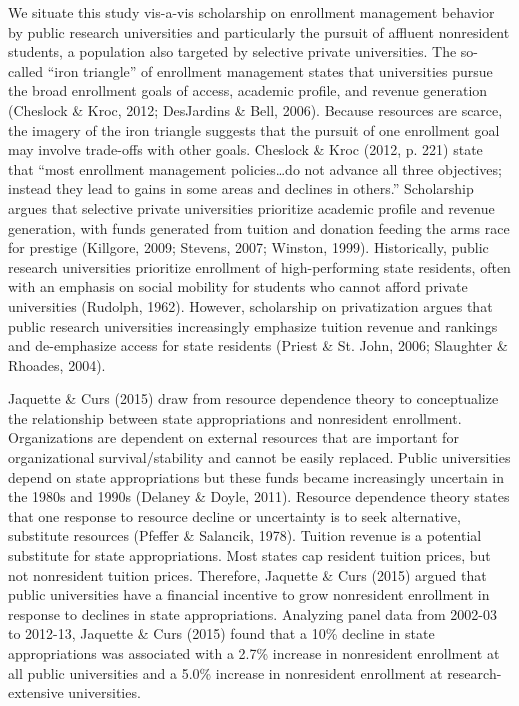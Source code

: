 \documentclass[
  12pt,
]{article}
\begin{document}
We situate this study vis-a-vis scholarship on enrollment management behavior by public research universities and particularly the pursuit of affluent nonresident students, a population also targeted by selective private universities. The so-called ``iron triangle'' of enrollment management states that universities pursue the broad enrollment goals of access, academic profile, and revenue generation (Cheslock \& Kroc, 2012; DesJardins \& Bell, 2006). Because resources are scarce, the imagery of the iron triangle suggests that the pursuit of one enrollment goal may involve trade-offs with other goals. Cheslock \& Kroc (2012, p. 221) state that ``most enrollment management policies\ldots do not advance all three objectives; instead they lead to gains in some areas and declines in others.'' Scholarship argues that selective private universities prioritize academic profile and revenue generation, with funds generated from tuition and donation feeding the arms race for prestige (Killgore, 2009; Stevens, 2007; Winston, 1999). Historically, public research universities prioritize enrollment of high-performing state residents, often with an emphasis on social mobility for students who cannot afford private universities (Rudolph, 1962). However, scholarship on privatization argues that public research universities increasingly emphasize tuition revenue and rankings and de-emphasize access for state residents (Priest \& St. John, 2006; Slaughter \& Rhoades, 2004).

Jaquette \& Curs (2015) draw from resource dependence theory to conceptualize the relationship between state appropriations and nonresident enrollment. Organizations are dependent on external resources that are important for organizational survival/stability and cannot be easily replaced. Public universities depend on state appropriations but these funds became increasingly uncertain in the 1980s and 1990s (Delaney \& Doyle, 2011). Resource dependence theory states that one response to resource decline or uncertainty is to seek alternative, substitute resources (Pfeffer \& Salancik, 1978). Tuition revenue is a potential substitute for state appropriations. Most states cap resident tuition prices, but not nonresident tuition prices. Therefore, Jaquette \& Curs (2015) argued that public universities have a financial incentive to grow nonresident enrollment in response to declines in state appropriations. Analyzing panel data from 2002-03 to 2012-13, Jaquette \& Curs (2015) found that a 10\% decline in state appropriations was associated with a 2.7\% increase in nonresident enrollment at all public universities and a 5.0\% increase in nonresident enrollment at research-extensive universities.
\end{document}
